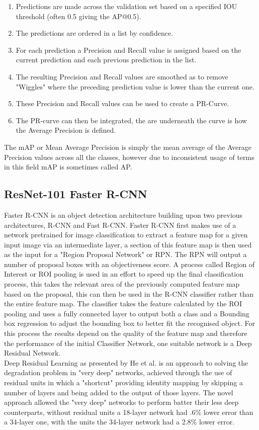 \documentclass[conference]{IEEEtran}
\begin{document}
\begin{enumerate}
    \item Predictions are made across the validation set based on a specified IOU threshold (often 0.5 giving the AP@0.5).
    \item The predictions are ordered in a list by confidence.
    \item For each prediction a Precision and Recall value is assigned based on the current prediction and each previous prediction in the list.
    \item The resulting Precision and Recall values are smoothed as to remove "Wiggles" where the preceding prediction value is lower than the current one.
    \item These Precision and Recall values can be used to create a PR-Curve.
    \item The PR-curve can then be integrated, the are underneath the curve is how the Average Precision is defined.
\end{enumerate}
The mAP or Mean Average Precision is simply the mean average of the Average Precision values across all the classes, however due to inconsistent usage of terms in this field mAP is sometimes called AP.


\subsection{ResNet-101 Faster R-CNN}
Faster R-CNN \cite{ren2016faster} is an object detection architecture building upon two previous architectures, R-CNN and Fast R-CNN. Faster R-CNN first makes use of a network pretrained for image classification to extract a feature map for a given input image via an intermediate layer, a section of this feature map is then used as the input for a "Region Proposal Network" or RPN. The RPN will output a number of proposal boxes with an objectiveness score. A process called Region of Interest or ROI pooling is used in an effort to speed up the final classification process, this takes the relevant area of the previously computed feature map based on the proposal, this can then be used in the R-CNN classifier rather than the entire feature map. The classifier takes the feature calculated by the ROI pooling and uses a fully connected layer to output both a class and a Bounding box regression to adjust the bounding box to better fit the recognised object. For this process the results depend on the quality of the feature map and therefore the performance of the initial Classifier Network, one suitable network is a Deep Residual Network. \\Deep Residual Learning as presented by He et al. \cite{he2015deep} is an approach to solving the degradation problem in "very deep" networks, achieved through the use of residual units in which a "shortcut" providing identity mapping by skipping a number of layers and being added to the output of those layers. The novel approach allowed the "very deep" networks to perform batter their less deep counterparts, without residual units a 18-layer network had .6\% lower error than a 34-layer one, with the units the 34-layer network had a 2.8\% lower error.
\end{document}
